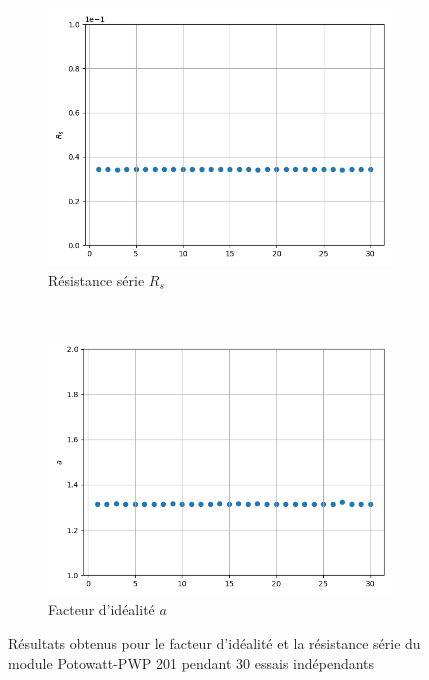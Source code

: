 \begin{figure}
    \centering
    \begin{subfigure}[b]{0.45\textwidth}
        \includegraphics[width=\textwidth]{resources/pwp/rsconsist.png}
        \caption{Résistance série $R_s$}
    \end{subfigure}
    ~
    \begin{subfigure}[b]{0.45\textwidth}
        \includegraphics[width=\textwidth]{resources/pwp/aconsist.png}
        \caption{Facteur d'idéalité $a$}
    \end{subfigure}
    \caption{Résultats obtenus pour le facteur d'idéalité et la résistance série du module Potowatt-PWP 201 pendant 30 essais indépendants}
    \label{fig:paramconsist}
\end{figure}

